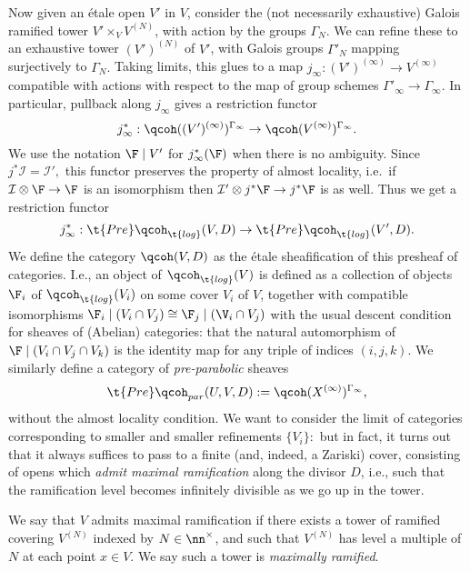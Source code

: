 \documentclass{article}
\newcommand{\I}{\mathcal{I}}
\begin{document}
Now given an \'etale open $V'$ in $V$, consider the (not necessarily exhaustive) Galois ramified tower $V'\times_V V^{(N)}$, with action by the groups $\Gamma_N$. We can refine these to an exhaustive tower $(V')^{(N)}$ of $V'$, with Galois groups $\Gamma'_N$ mapping surjectively to $\Gamma_N.$ Taking limits, this glues to a map $j_\infty:(V')^{(\infty)}\to V^{(\infty)}$ compatible with actions with respect to the map of group schemes $\Gamma'_\infty\to \Gamma_\infty.$ In particular, pullback along $j_\infty$ gives a restriction functor $$j_\infty^* : \qcoh((V')^{(\infty)})^{\Gamma_\infty}\to \qcoh(V^{(\infty)})^{\Gamma_\infty}.$$ We use the notation $\F\mid V'$ for $j_\infty^*(\F)$ when there is no ambiguity. Since $j^*\I = \I',$ this functor preserves the property of almost locality, i.e.\ if $\I\otimes \F \to \F$ is an isomorphism then $\I'\otimes j^*\F\to j^*\F$ is as well. Thus we get a restriction functor $$j_\infty^*:\t{Pre}\qcoh_{\t{log}}(V,D)\to \t{Pre}\qcoh_{\t{log}}(V', D).$$ We define the category $\qcoh(V, D)$ as the \'etale sheafification of this presheaf of categories. I.e., an object of $\qcoh_{\t{log}}(V)$ is defined as a collection of objects $\F_i$ of $\qcoh_{\t{log}}(V_i)$ on some cover $V_i$ of $V$, together with compatible isomorphisms $\F_i\mid (V_i\cap V_j)\cong \F_j\mid (\V_i\cap V_j)$ with the usual descent condition for sheaves of (Abelian) categories: that the natural automorphism of $\F\mid (V_i\cap V_j\cap V_k)$ is the identity map for any triple of indices $(i, j, k)$. We similarly define a category of \emph{pre-parabolic} sheaves $$\t{Pre}\qcoh_{par}(U, V, D): = \qcoh(X^{(\infty)})^{\Gamma_\infty},$$ without the almost locality condition. We want to consider the limit of categories corresponding to smaller and smaller refinements $\{V_i\}:$ but in fact, it turns out that it always suffices to pass to a finite (and, indeed, a Zariski) cover, consisting of opens which \emph{admit maximal ramification} along the divisor $D$, i.e., such that the ramification level becomes infinitely divisible as we go up in the tower. 
\begin{defi} 
We say that $V$ admits maximal ramification if there exists a tower of ramified covering $V^{(N)}$ indexed by $N\in \nn^\times$, and such that $V^{(N)}$ has level a multiple of $N$ at each point $x\in V$. We say such a tower is \emph{maximally ramified}.
\end{defi}
\end{document}

